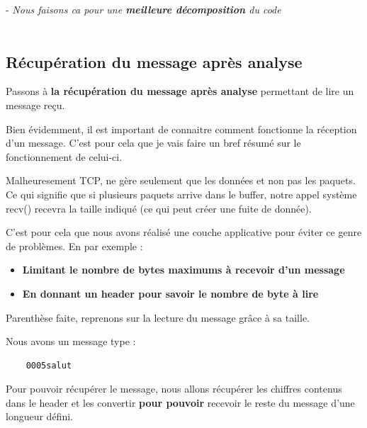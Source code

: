     \tab[2cm]- \textit{Nous faisons ca pour une \textbf{meilleure décomposition} du code} \\ \\

    
\subsection{Récupération du message après analyse}

Passons à \textbf{la récupération du message après analyse} permettant de lire un message reçu.

Bien évidemment, il est important de connaitre comment fonctionne la réception d'un message. C'est pour cela que je  vais faire un bref résumé sur le fonctionnement de celui-ci. \\ \par

Malheuresement TCP, ne gère seulement que les données et non pas les paquets. Ce qui signifie que si plusieurs paquets arrive dans le buffer, notre appel système recv() recevra la taille indiqué (ce qui peut créer une fuite de donnée). \\ \par


C'est pour cela que nous avons réalisé une couche applicative pour éviter ce genre de problèmes. En par exemple :
\begin{itemize}
    \item \textbf{Limitant le nombre de bytes maximums à recevoir d'un message}
    \item \textbf{En donnant un header pour savoir le nombre de byte à lire}
\end{itemize}

Parenthèse faite, reprenons sur la lecture du message grâce à sa taille.

Nous avons un message type :

\begin{lstlisting}
    0005salut
\end{lstlisting}

Pour pouvoir récupérer le message, nous allons récupérer les chiffres contenus dans le header et les convertir \textbf{pour pouvoir} recevoir le reste du message d'une longueur défini. \\ \\ \par

